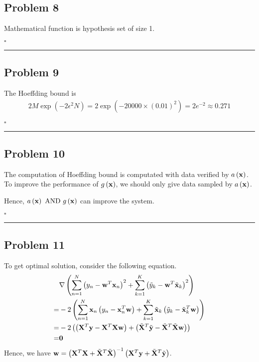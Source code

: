 \documentclass[12pt]{article}
\newcommand*{\QEDB}{\hfill\ensuremath{\square}}
\newcommand{\ParTh}[1]{\left(#1\right)}
\newcommand{\BF}[1]{{\bf#1}}
\newcommand{\horrule}[1]{\rule{\linewidth}{#1}}
\begin{document}
\subsection*{Problem 8}

Mathematical function is hypothesis set of size 1.
\begin{comment}
The mathematical derivations with perfect prediction, which means the hypothesis set shatters the $N$ data. So the size of the hypothesis is $2^N$.
\end{comment}

\QEDB

\horrule{0.5pt}

\subsection*{Problem 9}

The Hoeffding bound is
\begin{align}
2M\exp\ParTh{-2\epsilon^2N}=2\exp\ParTh{-20000\times\ParTh{0.01}^2}=2e^{-2}\approx0.271
\end{align}

\QEDB

\horrule{0.5pt}

\subsection*{Problem 10}

The computation of Hoeffding bound is computated with data verified by $a\ParTh{\BF{x}}$. To improve the performance of $g\ParTh{\BF{x}}$, we should only give data sampled by $a\ParTh{\BF{x}}$.

Hence, $a\ParTh{\BF{x}}\text{ AND }g\ParTh{\BF{x}}$ can improve the system.

\QEDB

\horrule{0.5pt}

\subsection*{Problem 11}

To get optimal solution, consider the following equation.
\begin{align}
&\nabla\ParTh{\sum_{n=1}^{N}\ParTh{y_n-\BF{w}^T\BF{x}_n}^2+\sum_{k=1}^{K}\ParTh{\tilde{y}_k-\BF{w}^T\tilde{\BF{x}}_k}^2}\\
=&-2\ParTh{\sum_{n=1}^{N}\BF{x}_n\ParTh{y_n-\BF{x}^T_n\BF{w}}+\sum_{k=1}^{K}\tilde{\BF{x}}_k\ParTh{\tilde{y}_k-\tilde{\BF{x}}^T_k\BF{w}}}\\
=&-2\ParTh{\ParTh{\BF{X}^T\BF{y}-\BF{X}^T\BF{X}\BF{w}}+\ParTh{\tilde{\BF{X}}^T\tilde{\BF{y}}-\tilde{\BF{X}}^T\tilde{\BF{X}}\BF{w}}}\\
=&\BF{0}
\end{align}
Hence, we have $\BF{w}=\ParTh{\BF{X}^T\BF{X}+\tilde{\BF{X}}^T\tilde{\BF{X}}}^{-1}\ParTh{\BF{X}^T\BF{y}+\tilde{\BF{X}}^T\tilde{\BF{y}}}$.
\end{document}
